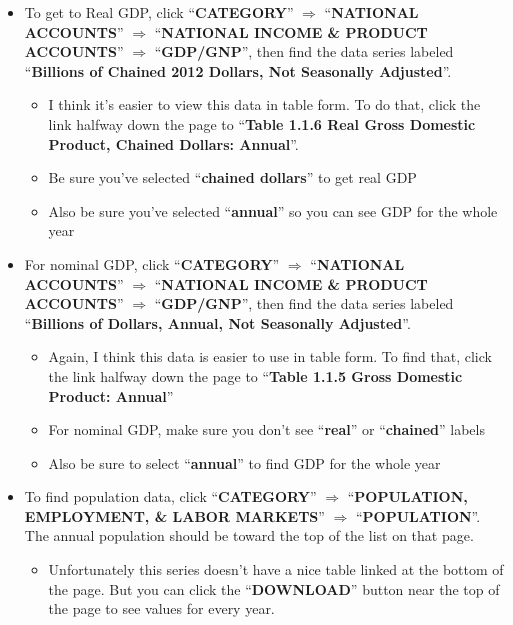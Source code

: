\documentclass[14pt]{extarticle}
\begin{document}
\begin{Exercise}
\begin{itemize}
    \item To get to Real GDP, click ``\textbf{CATEGORY}'' $ \Rightarrow  $ ``\textbf{NATIONAL ACCOUNTS}'' $ \Rightarrow $ ``\textbf{NATIONAL INCOME \& PRODUCT ACCOUNTS}'' $ \Rightarrow $ ``\textbf{GDP/GNP}'', then find the data series labeled ``\textbf{Billions of Chained 2012 Dollars, Not Seasonally Adjusted}''.
    \begin{itemize}
        \item I think it's easier to view this data in table form. To do that, click the link halfway down the page to ``\textbf{Table 1.1.6 Real Gross Domestic Product, Chained Dollars: Annual}''.
        \item Be sure you’ve selected ``\textbf{chained dollars}'' to get real GDP
        \item Also be sure you’ve selected ``\textbf{annual}'' so you can see GDP for the whole year
    \end{itemize}
    \item For nominal GDP, click ``\textbf{CATEGORY}'' $ \Rightarrow $ ``\textbf{NATIONAL ACCOUNTS}'' $ \Rightarrow $ ``\textbf{NATIONAL INCOME \& PRODUCT ACCOUNTS}'' $ \Rightarrow $ ``\textbf{GDP/GNP}'', then find the data series labeled ``\textbf{Billions of Dollars, Annual, Not Seasonally Adjusted}''.
    \begin{itemize}
        \item Again, I think this data is easier to use in table form. To find that, click the link halfway down the page to ``\textbf{Table 1.1.5 Gross Domestic Product: Annual}''
        \item For nominal GDP, make sure you don’t see ``\textbf{real}'' or ``\textbf{chained}'' labels
        \item Also be sure to select ``\textbf{annual}'' to find GDP for the whole year
    \end{itemize}
    \item To find population data, click ``\textbf{CATEGORY}'' $ \Rightarrow $ ``\textbf{POPULATION, EMPLOYMENT, \& LABOR MARKETS}'' $ \Rightarrow $ ``\textbf{POPULATION}''. The annual population should be toward the top of the list on that page.
    \begin{itemize}
        \item Unfortunately this series doesn’t have a nice table linked at the bottom of the page. But you can click the ``\textbf{DOWNLOAD}'' button near the top of the page to see values for every year.
    \end{itemize}
\end{itemize}


\end{Exercise}
\end{document}
